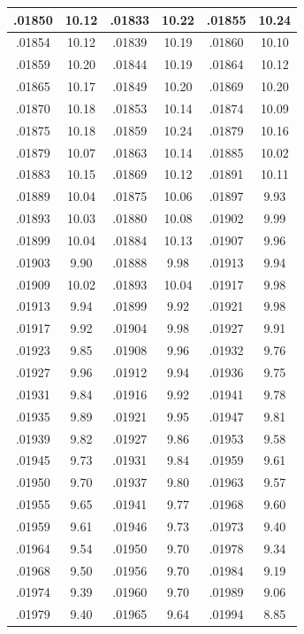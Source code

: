 \documentclass[10pt,twoside]{report}
\begin{document}
\begin{appendices}
\begin{longtable}{|c|c||c|c||c|c|}
.01850 & 10.12 & .01833 & 10.22 & .01855 & 10.24\\\hline
.01854 & 10.12 & .01839 & 10.19 & .01860 & 10.10\\\hline
.01859 & 10.20 & .01844 & 10.19 & .01864 & 10.12\\\hline
.01865 & 10.17 & .01849 & 10.20 & .01869 & 10.20\\\hline
.01870 & 10.18 & .01853 & 10.14 & .01874 & 10.09\\\hline
.01875 & 10.18 & .01859 & 10.24 & .01879 & 10.16\\\hline
.01879 & 10.07 & .01863 & 10.14 & .01885 & 10.02\\\hline
.01883 & 10.15 & .01869 & 10.12 & .01891 & 10.11\\\hline
.01889 & 10.04 & .01875 & 10.06 & .01897 & 9.93\\\hline
.01893 & 10.03 & .01880 & 10.08 & .01902 & 9.99\\\hline
.01899 & 10.04 & .01884 & 10.13 & .01907 & 9.96\\\hline
.01903 & 9.90 & .01888 & 9.98 & .01913 & 9.94\\\hline
.01909 & 10.02 & .01893 & 10.04 & .01917 & 9.98\\\hline
.01913 & 9.94 & .01899 & 9.92 & .01921 & 9.98\\\hline
.01917 & 9.92 & .01904 & 9.98 & .01927 & 9.91\\\hline
.01923 & 9.85 & .01908 & 9.96 & .01932 & 9.76\\\hline
.01927 & 9.96 & .01912 & 9.94 & .01936 & 9.75\\\hline
.01931 & 9.84 & .01916 & 9.92 & .01941 & 9.78\\\hline
.01935 & 9.89 & .01921 & 9.95 & .01947 & 9.81\\\hline
.01939 & 9.82 & .01927 & 9.86 & .01953 & 9.58\\\hline
.01945 & 9.73 & .01931 & 9.84 & .01959 & 9.61\\\hline
.01950 & 9.70 & .01937 & 9.80 & .01963 & 9.57\\\hline
.01955 & 9.65 & .01941 & 9.77 & .01968 & 9.60\\\hline
.01959 & 9.61 & .01946 & 9.73 & .01973 & 9.40\\\hline
.01964 & 9.54 & .01950 & 9.70 & .01978 & 9.34\\\hline
.01968 & 9.50 & .01956 & 9.70 & .01984 & 9.19\\\hline
.01974 & 9.39 & .01960 & 9.70 & .01989 & 9.06\\\hline
.01979 & 9.40 & .01965 & 9.64 & .01994 & 8.85\\\hline

\end{longtable}
\end{appendices}
\end{document}
